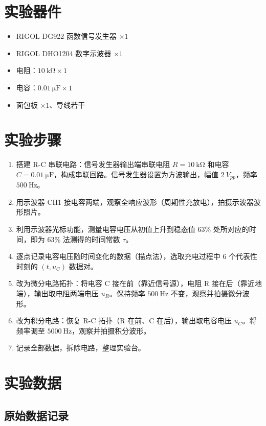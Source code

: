 \section{实验器件}

\begin{itemize}
    \item RIGOL DG922 函数信号发生器 \(\times 1\)
    \item RIGOL DHO1204 数字示波器 \(\times 1\)
    \item 电阻：\(\SI{10}{\kilo\ohm}\times 1\)
    \item 电容：\(\SI{0.01}{\micro\farad}\times 1\)
    \item 面包板 \(\times 1\)、导线若干
\end{itemize}

\section{实验步骤}

\begin{enumerate}[label=\arabic*.]
    \item 搭建 R-C 串联电路：信号发生器输出端串联电阻 \(R=\SI{10}{\kilo\ohm}\) 和电容 \(C=\SI{0.01}{\micro\farad}\)，构成串联回路。信号发生器设置为方波输出，幅值 \(\SI{2}{V_{pp}}\)，频率 \(\SI{500}{\hertz}\)。
    \item 用示波器 CH1 接电容两端，观察全响应波形（周期性充放电），拍摄示波器波形照片。
    \item 利用示波器光标功能，测量电容电压从初值上升到稳态值 \(63\%\) 处所对应的时间，即为 63\% 法测得的时间常数 \(\tau\)。
    \item 逐点记录电容电压随时间变化的数据（描点法），选取充电过程中 6 个代表性时刻的 \((t, u_C)\) 数据对。
    \item 改为微分电路拓扑：将电容 C 接在前（靠近信号源），电阻 R 接在后（靠近地端），输出取电阻两端电压 \(u_R\)。保持频率 \(\SI{500}{\hertz}\) 不变，观察并拍摄微分波形。
    \item 改为积分电路：恢复 R-C 拓扑（R 在前、C 在后），输出取电容电压 \(u_C\)。将频率调至 \(\SI{5000}{\hertz}\)，观察并拍摄积分波形。
    \item 记录全部数据，拆除电路，整理实验台。
\end{enumerate}

\section{实验数据}

\subsection{原始数据记录}

